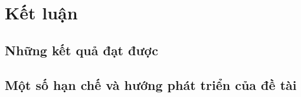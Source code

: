 \chapter{Kết luận}

\section{Những kết quả đạt được}

\section{Một số hạn chế và hướng phát triển của đề tài}